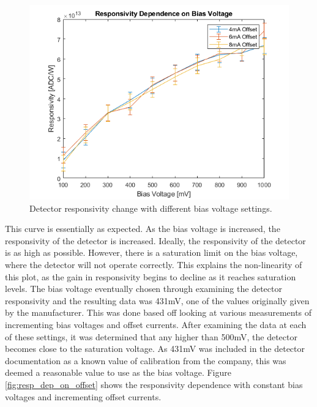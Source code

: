 \begin{figure}[h]
  \includegraphics[width=\linewidth]{chap6_images/verification/resp_dependence_on_bias.png}
  \caption{Detector responsivity change with different bias voltage settings.}
  \label{fig:resp_dep_on_bias}
\end{figure}

This curve is essentially as expected. As the bias voltage is increased, the responsivity of the detector is increased. Ideally, the responsivity of the detector is as high as possible. However, there is a saturation limit on the bias voltage, where the detector will not operate correctly. This explains the non-linearity of this plot, as the gain in responsivity begins to decline as it reaches saturation levels. The bias voltage eventually chosen through examining the detector responsivity and the resulting data was 431mV, one of the values originally given by the manufacturer. This was done based off looking at various measurements of incrementing bias voltages and offset currents. After examining the data at each of these settings, it was determined that any higher than 500mV, the detector becomes close to the saturation voltage. As 431mV was included in the detector documentation as a known value of calibration from the company, this was deemed a reasonable value to use as the bias voltage. Figure \ref{fig:resp_dep_on_offset} shows the responsivity dependence with constant bias voltages and incrementing offset currents.

